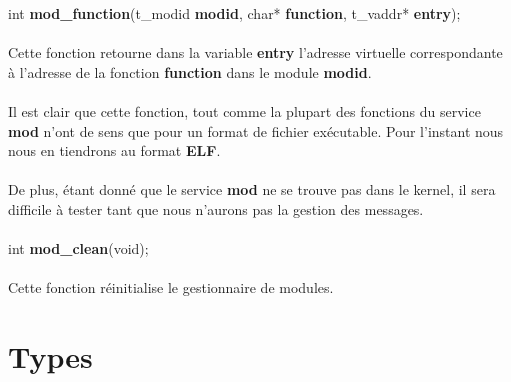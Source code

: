 \documentclass[10pt,a4wide]{article}
\begin{document}
\hspace{1.5cm}int \textbf{mod\_function}(t\_modid \textbf{modid},
                                         char* \textbf{function},
                                         t\_vaddr* \textbf{entry});

\paragraph{}

Cette fonction retourne dans la variable \textbf{entry} l'adresse virtuelle
correspondante \`a l'adresse de la fonction \textbf{function} dans le
module \textbf{modid}.

\paragraph{}

Il est clair que cette fonction, tout comme la plupart des fonctions du
service \textbf{mod} n'ont de sens que pour un format de fichier ex\'ecutable.
Pour l'instant nous nous en tiendrons au format \textbf{ELF}.

\paragraph{}

De plus, \'etant donn\'e que le service \textbf{mod} ne se trouve pas dans
le kernel, il sera difficile \`a tester tant que nous n'aurons pas la
gestion des messages.

\paragraph{}

\hspace{1.5cm}int \textbf{mod\_clean}(void);

\paragraph{}

Cette fonction r\'einitialise le gestionnaire de modules.

\section{Types}

\paragraph{}
\end{document}
